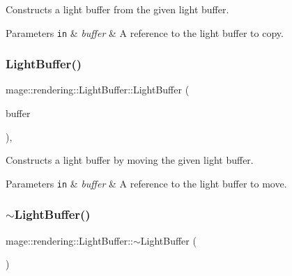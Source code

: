 Constructs a light buffer from the given light buffer.


\begin{DoxyParams}[1]{Parameters}
\mbox{\tt in}  & {\em buffer} & A reference to the light buffer to copy. \\
\hline
\end{DoxyParams}
\hypertarget{structmage_1_1rendering_1_1_light_buffer_a016cbba8dd68da2f80a7018e2276070d}{}\label{structmage_1_1rendering_1_1_light_buffer_a016cbba8dd68da2f80a7018e2276070d} 
\subsubsection{\texorpdfstring{Light\+Buffer()}{LightBuffer()}\hspace{0.1cm}{\footnotesize\ttfamily [3/3]}}
{\footnotesize\ttfamily mage\+::rendering\+::\+Light\+Buffer\+::\+Light\+Buffer (\begin{DoxyParamCaption}\item[{\hyperlink{structmage_1_1rendering_1_1_light_buffer}{Light\+Buffer} \&\&}]{buffer }\end{DoxyParamCaption})\hspace{0.3cm}{\ttfamily [default]}, {\ttfamily [noexcept]}}

Constructs a light buffer by moving the given light buffer.


\begin{DoxyParams}[1]{Parameters}
\mbox{\tt in}  & {\em buffer} & A reference to the light buffer to move. \\
\hline
\end{DoxyParams}
\hypertarget{structmage_1_1rendering_1_1_light_buffer_a36fd7699f61cde6359d6934428eb9daf}{}\label{structmage_1_1rendering_1_1_light_buffer_a36fd7699f61cde6359d6934428eb9daf} 
\subsubsection{\texorpdfstring{$\sim$\+Light\+Buffer()}{~LightBuffer()}}
{\footnotesize\ttfamily mage\+::rendering\+::\+Light\+Buffer\+::$\sim$\+Light\+Buffer (\begin{DoxyParamCaption}{ }\end{DoxyParamCaption})\hspace{0.3cm}{\ttfamily [default]}}

